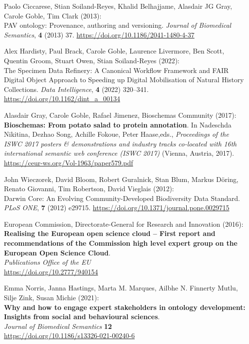 \begin{thebibliography}{9}
{
Paolo Ciccarese, Stian Soiland-Reyes, Khalid Belhajjame, Alasdair JG
Gray, Carole Goble, Tim Clark (2013): \\
{PAV} ontology: Provenance,
authoring and versioning. \emph{Journal of Biomedical Semantics},
\textbf{4} (2013) 37.
\url{https://doi.org/10.1186/2041-1480-4-37}

Alex Hardisty, Paul Brack, Carole Goble, Laurence Livermore, Ben Scott,
Quentin Groom, Stuart Owen, Stian Soiland-Reyes (2022): \\
The {Specimen
Data Refinery}: {A Canonical Workflow Framework} and {FAIR} {Digital
Object Approach} to {Speeding} up {Digital Mobilisation} of {Natural
History} {Collections}. \emph{Data Intelligence}, \textbf{4} (2022)
320--341.
\url{https://doi.org/10.1162/dint_a_00134}

Alasdair Gray, Carole Goble, Rafael Jimenez, Bioschemas Community
(2017): \\
\textbf{Bioschemas: From potato salad to protein annotation}. In
Nadeschda Nikitina, Dezhao Song, Achille Fokoue, Peter Haase,eds.,
\emph{Proceedings of the ISWC 2017 posters \& demonstrations and
industry tracks co-located with 16th international semantic web
conference (ISWC 2017)} (Vienna, Austria, 2017).
\url{https://ceur-ws.org/Vol-1963/paper579.pdf}

John Wieczorek, David Bloom, Robert Guralnick, Stan Blum, Markus Döring,
Renato Giovanni, Tim Robertson, David Vieglais (2012): \\
Darwin {Core}:
{An Evolving Community-Developed Biodiversity Data Standard}. \emph{PLoS
ONE}, \textbf{7} (2012) e29715.
\url{https://doi.org/10.1371/journal.pone.0029715}

European Commission, Directorate-General for Research and Innovation (2016): \\ 
\textbf{Realising the European open science cloud – First report and recommendations of the Commission high level expert group on the European Open Science Cloud}. \\
\emph{Publications Office of the EU} \\
\url{https://doi.org/10.2777/940154}

Emma Norris, Janna Hastings, Marta M. Marques, Ailbhe N. Finnerty Mutlu,
Silje Zink, Susan Michie (2021): \\
\textbf{Why and how to engage expert
stakeholders in ontology development: Insights from social and
behavioural sciences}. \\
\emph{Journal of Biomedical Semantics} \textbf{12} \\
\url{https://doi.org/10.1186/s13326-021-00240-6}

}
\end{thebibliography}
